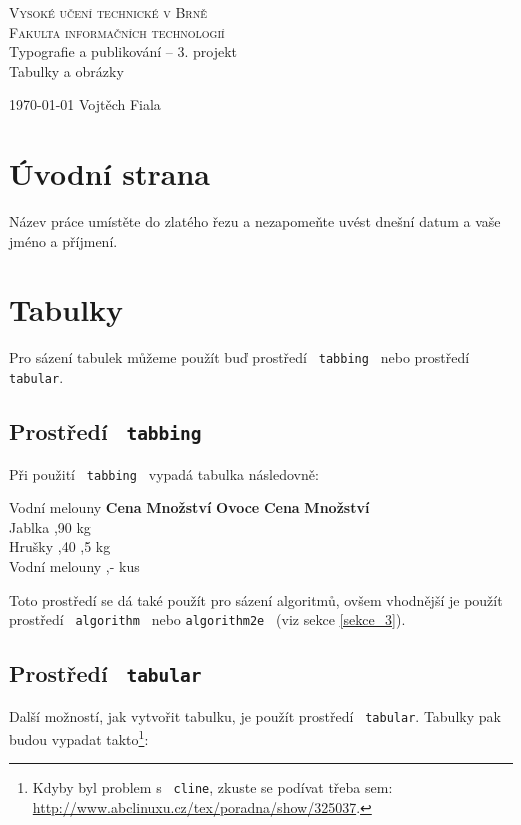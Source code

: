 \documentclass[a4paper, 11pt]{article}
\begin{document}
	\begin{titlepage}
		\begin{center}
			{\Huge\textsc{
				Vysoké učení technické v Brně\\[0.3em]}}
				{\huge\textsc{Fakulta informačních technologií
			}}
			\\
			{\LARGE
				 Typografie a publikování -- 3. projekt\\[0.3em]}
				 {\Huge{Tabulky a obrázky}}
		\end{center}
		{\Large
		    \today
			\hfill
			Vojtěch Fiala
		}
	\end{titlepage}

    \section{Úvodní strana}
    Název práce umístěte do zlatého řezu a nezapomeňte uvést dnešní datum a vaše jméno a příjmení.
    
    \section{Tabulky}
    Pro sázení tabulek můžeme použít buď prostředí \verb! tabbing ! nebo prostředí \verb! tabular!.
    
    \subsection{Prostředí \texttt{ tabbing}}
    Při použití \verb! tabbing ! vypadá tabulka následovně:

    \begin{tabbing}
    Vodní melouny \quad  \= \textbf{Cena} \quad \= \textbf{Množství} \kill
    \textbf{Ovoce} \> \textbf{Cena} \> \textbf{Množství} \\
    Jablka ,90  kg \\
    Hrušky ,40 ,5 kg \\
    Vodní melouny ,-  kus \\
    \end{tabbing}
    Toto prostředí se dá také použít pro sázení algoritmů, ovšem vhodnější je použít prostředí \verb! algorithm ! nebo \verb!algorithm2e ! (viz sekce \ref{sekce_3}).
	
	\subsection{Prostředí \texttt{ tabular}}
	Další možností, jak vytvořit tabulku, je použít prostředí \verb! tabular!. Tabulky pak budou vypadat takto\footnote{Kdyby byl problem s \texttt{ cline}, zkuste se podívat třeba sem: \url{http://www.abclinuxu.cz/tex/poradna/show/325037}.}:
    
\end{document}
